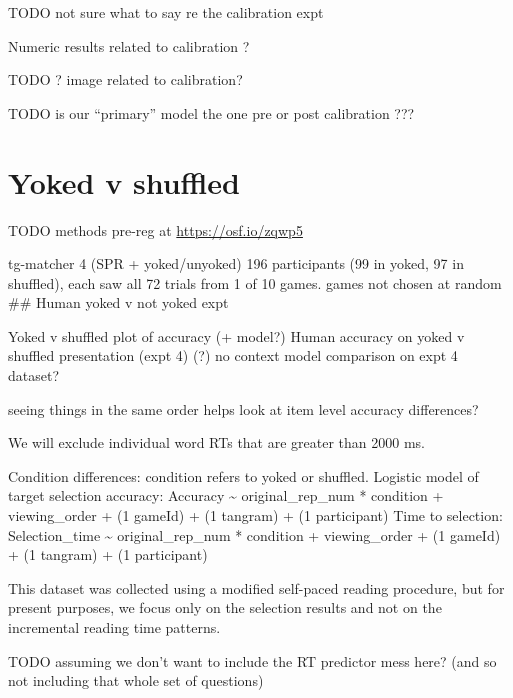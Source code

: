 \documentclass[10pt, letterpaper]{article}
\begin{document}
TODO not sure what to say re the calibration expt

Numeric results related to calibration ?

TODO ? image related to calibration?

TODO is our ``primary'' model the one pre or post calibration ???

\section{Yoked v shuffled}\label{yoked-v-shuffled}

TODO methods pre-reg at \url{https://osf.io/zqwp5}

tg-matcher 4 (SPR + yoked/unyoked) 196 participants (99 in yoked, 97 in
shuffled), each saw all 72 trials from 1 of 10 games. games not chosen
at random \#\# Human yoked v not yoked expt

Yoked v shuffled plot of accuracy (+ model?) Human accuracy on yoked v
shuffled presentation (expt 4) (?) no context model comparison on expt 4
dataset?

seeing things in the same order helps look at item level accuracy
differences?

We will exclude individual word RTs that are greater than 2000 ms.

Condition differences: condition refers to yoked or shuffled. Logistic
model of target selection accuracy: Accuracy \textasciitilde{}
original\_rep\_num * condition + viewing\_order + (1 \textbar{} gameId)
+ (1 \textbar{} tangram) + (1 \textbar{} participant) Time to selection:
Selection\_time \textasciitilde{} original\_rep\_num * condition +
viewing\_order + (1 \textbar{} gameId) + (1 \textbar{} tangram) + (1
\textbar{} participant)

This dataset was collected using a modified self-paced reading
procedure, but for present purposes, we focus only on the selection
results and not on the incremental reading time patterns.

TODO assuming we don't want to include the RT predictor mess here? (and
so not including that whole set of questions)
\end{document}
